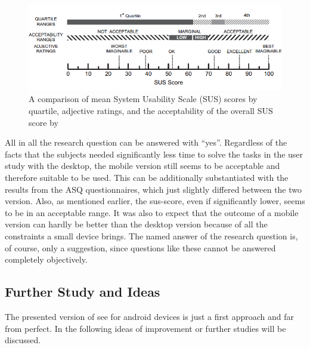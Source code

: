 \begin{figure}[htb]
    \centering
    \includegraphics[width=1\textwidth]{Conclusion/img/sus.png}
    \caption{A comparison of mean System Usability Scale (SUS) scores by quartile,
    adjective ratings, and the acceptability of the overall SUS score by \cite{doi:10.1080/10447310802205776}}\label{fig:sus_scale}
  \end{figure}

  All in all the research question can be answered with \enquote{yes}.
  Regardless of the facts that the subjects needed significantly less time to solve the tasks in the user study with the desktop, the mobile version still seems to be acceptable and therefore suitable to be used.
  This can be additionally substantiated with the results from the \gls{ASQ} questionnaires, which just slightly differed between the two version.
  Also, as mentioned earlier, the \gls{sus}-score, even if significantly lower, seems to be in an acceptable range.
  It was also to expect that the outcome of a mobile version can hardly be better than the desktop version because of all the constraints a small device brings.
  The named answer of the research question is, of course, only a suggestion, since questions like these cannot be answered completely objectively.

\subsection{Further Study and Ideas}
The presented version of \gls{see} for \gls{android} devices is just a first approach and far from perfect. 
In the following ideas of improvement or further studies will be discussed.

